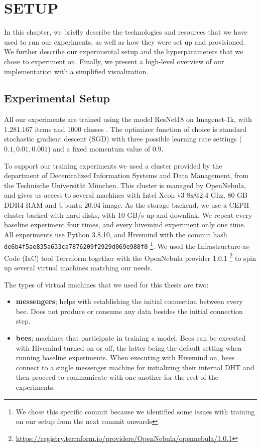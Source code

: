 \chapter{SETUP}\label{chapter:setup}

In this chapter, we briefly describe the technologies and resources that we have used to run our experiments, as well as how they were set up and provisioned.
We further describe our experimental setup and the hyperparameters that we chose to experiment on.
Finally, we present a high-level overview of our implementation with a simplified visualization.

\section{Experimental Setup}

All our experiments are trained using the model ResNet18 \cite{he2015deep} on Imagenet-1k, with $1.281.167$ items and $1000$ classes \cite{deng2009imagenet}.
The optimizer function of choice is standard stochastic gradient descent (SGD) with three possible learning rate settings ($0.1, 0.01, 0.001$) and a fixed momentum value of $0.9$.

To support our training experiments we used a cluster provided by the department of Decentralized Information Systems and Data Management, from the Technische Universität München.
This cluster is managed by OpenNebula, and gives us access to several machines with Intel Xeon v3 8x@2.4 Ghz, 80 GB DDR4 RAM and Ubuntu 20.04 image.
As the storage backend, we use a CEPH cluster backed with hard disks, with 10 GB/s up and downlink.
We repeat every baseline experiment four times, and every hivemind experiment only one time.
All experiments use Python 3.8.10, and Hivemind with the commit hash \texttt{de6b4f5ae835a633ca7876209f2929d069e988f0}
\footnote{We chose this specific commit because we identified some issues with training on our setup from the next commit onwards}.
We used the Infrastructure-as-Code (IaC) tool Terraform together with the OpenNebula provider 1.0.1
\footnote{\href{https://registry.terraform.io/providers/OpenNebula/opennebula/1.0.1}{https://registry.terraform.io/providers/OpenNebula/opennebula/1.0.1}}
to spin up several virtual machines matching our needs.

The types of virtual machines that we used for this thesis are two:
\begin{itemize}
    \item \textbf{messengers}; helps with establishing the initial connection between every bee.
          Does not produce or consume any data besides the initial connection step.
    \item \textbf{bees}; machines that participate in training a model.
          Bees can be executed with Hivemind turned on or off, the latter being the default setting when running baseline experiments.
          When executing with Hivemind on, bees connect to a single messenger machine for initializing their internal DHT and then proceed to communicate with one another for the rest of the experiments.
\end{itemize}

